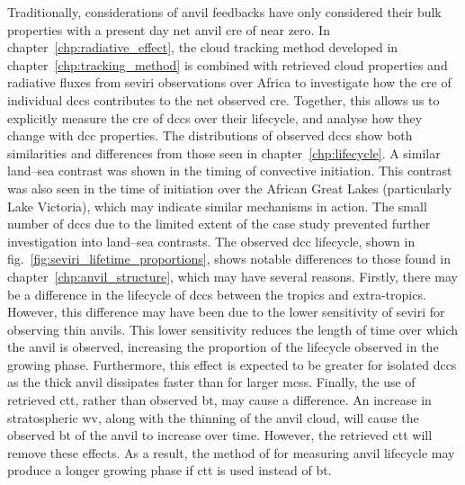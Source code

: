 
Traditionally, considerations of anvil feedbacks have only considered their bulk properties with a present day net anvil \acrshort{cre} of near zero.
In chapter~\ref{chp:radiative_effect}, the cloud tracking method developed in chapter~\ref{chp:tracking_method} is combined with retrieved cloud properties and radiative fluxes from \acrshort{seviri} observations over Africa to investigate how the \acrshort{cre} of individual \acrshort{dcc}s contributes to the net observed \acrshort{cre}. 
Together, this allows us to explicitly measure the \acrshort{cre} of \acrshort{dcc}s over their lifecycle, and analyse how they change with \acrshort{dcc} properties.
The distributions of observed \acrshort{dcc}s show both similarities and differences from those seen in chapter~\ref{chp:lifecycle}.
A similar land--sea contrast was shown in the timing of convective initiation.
This contrast was also seen in the time of initiation over the African Great Lakes (particularly Lake Victoria), which may indicate similar mechanisms in action.
The small number of \acrshort{dcc}s due to the limited extent of the case study prevented further investigation into land--sea contrasts.
The observed \acrshort{dcc} lifecycle, shown in fig.~\ref{fig:seviri_lifetime_proportions}, shows notable differences to those found in chapter~\ref{chp:anvil_structure}, which may have several reasons.
Firstly, there may be a difference in the lifecycle of \acrshort{dcc}s between the tropics and extra-tropics.
However, this difference may have been due to the lower sensitivity of \acrshort{seviri} for observing thin anvils.
This lower sensitivity reduces the length of time over which the anvil is observed, increasing the proportion of the lifecycle observed in the growing phase.
Furthermore, this effect is expected to be greater for isolated \acrshort{dcc}s as the thick anvil dissipates faster than for larger \acrshort{mcs}s.
Finally, the use of retrieved \acrshort{ctt}, rather than observed \acrshort{bt}, may cause a difference.
An increase in stratospheric \acrshort{wv}, along with the thinning of the anvil cloud, will cause the observed \acrshort{bt} of the anvil to increase over time.
However, the retrieved \acrshort{ctt} will remove these effects.
As a result, the method of \citet{futyan_deep_2007} for measuring anvil lifecycle may produce a longer growing phase if \acrshort{ctt} is used instead of \acrshort{bt}.

